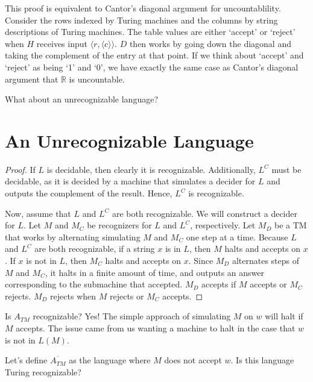 This proof is equivalent to Cantor's diagonal argument for uncountablility.  Consider the rows indexed by Turing machines and the columns by string descriptions of Turing machines.  The table values are either `accept' or `reject' when $H$ receives input $\langle r,\langle c \rangle \rangle$.  $D$ then works by going down the diagonal and taking the complement of the entry at that point.  If we think about `accept' and `reject' as being `1' and `0', we have exactly the same case as Cantor's diagonal argument that $\mathbb{R}$ is uncountable.

What about an unrecognizable language?  

\section*{An Unrecognizable Language}


\begin{proof}
	
	If $L$ is decidable, then clearly it is recognizable.  Additionally, $L^C$ must be decidable, as it is decided by a machine that simulates a decider for $L$ and outputs the complement of the result.
	Hence, $L^C$ is recognizable.
	
	Now, assume that $L$ and $L^C$ are both recognizable.  We will construct a decider for $L$.  Let $M$ and $M_C$ be recognizers for $L$ and $L^C$, respectively.  Let $M_D$ be a TM that works by alternating simulating $M$ and $M_C$ one step at a time.  Because $L$ and $L^C$ are both recognizable, if a string $x$ is in $L$, then $M$ halts and accepts on $x$.  If $x$ is not in $L$, then $M_C$ halts and accepts on $x$.  Since $M_D$ alternates steps of $M$ and $M_C$, it halts in a finite amount of time, and outputs an answer corresponding to the submachine that accepted.  $M_D$ accepts if $M$ accepts or $M_C$ rejects.  $M_D$ rejects when $M$ rejects or $M_C$ accepts.
	
	
	
	
\end{proof}


Is $A_{TM}$ recognizable?  Yes!  The simple approach of simulating $M$ on $w$ will halt if $M$ accepts.  The issue came from us wanting a machine to halt in the case that $w$ is not in $L(M)$.

Let's define $\overline{A_{TM}}$ as the language where $M$ does not accept $w$.  Is this language Turing recognizable?

